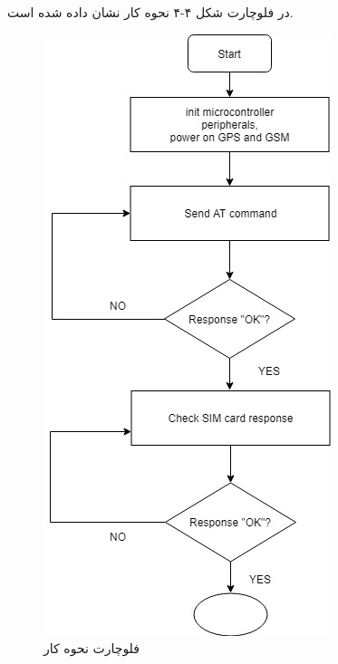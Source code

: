 \newpage
در فلوچارت شکل ۴-۴ نحوه کار  نشان داده شده است.\\
\begin{figure}[!h]
	\centerline{\includegraphics[width=.6\textwidth]{gsm-flowchart}}
	\caption{فلوچارت نحوه کار  \cite{ElShafee2013}}
\end{figure}
\newpage

